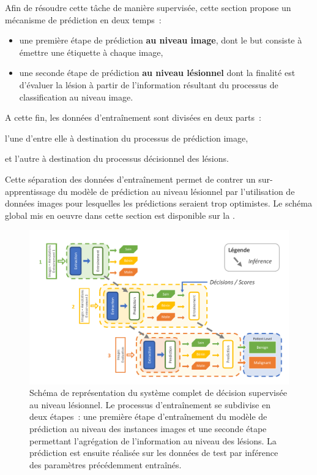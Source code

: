 Afin de résoudre cette tâche de manière supervisée, cette section propose un mécanisme de prédiction en deux temps~: 
\begin{itemize}
    \item une première étape de prédiction \textbf{au niveau image}, dont le but consiste à émettre une étiquette à chaque image,
    \item une seconde étape de prédiction \textbf{au niveau lésionnel} dont la finalité est d'évaluer la lésion à partir de l'information résultant du processus de classification au niveau image.
\end{itemize} A cette fin, les données d'entraînement sont divisées en deux parts~:
\begin{inlinerate}
    \item l'une d'entre elle à destination du processus de prédiction image,
    \item et l'autre à destination du processus décisionnel des lésions.
\end{inlinerate}
Cette séparation des données d'entraînement permet de contrer un sur-apprentissage du modèle de prédiction au niveau lésionnel par l'utilisation de données images pour lesquelles les prédictions seraient trop optimistes. Le schéma global mis en oeuvre dans cette section est disponible sur la .\par

\begin{figure}[H]
    \centering
    \includegraphics[width=0.95\linewidth]{contents/chapter_7/resources/scheme_patient_decision.pdf}
    \caption{Schéma de représentation du système complet de décision supervisée au niveau lésionnel. Le processus d'entraînement se subdivise en deux étapes~: une première étape d'entraînement du modèle de prédiction au niveau des instances images et une seconde étape permettant l'agrégation de l'information au niveau des lésions. La prédiction est ensuite réalisée sur les données de test par inférence des paramètres précédemment entraînés.}
    \label{fig:scheme_patient_decision}
\end{figure}\par

